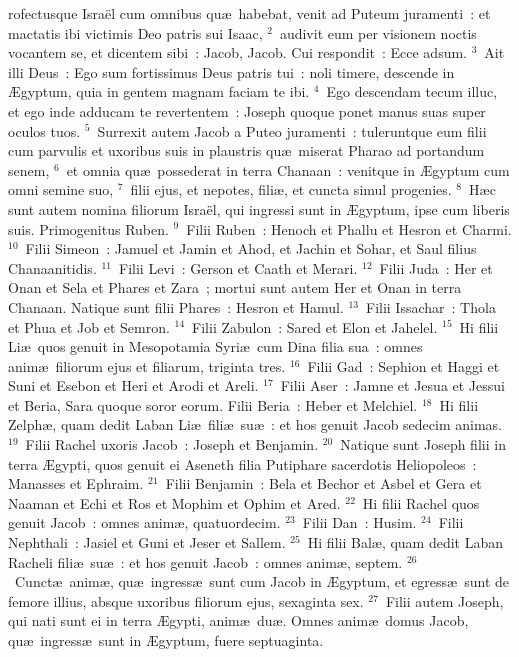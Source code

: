 \bchapter
{}rofectusque Isra\"el cum omnibus qu\ae\ habebat, venit ad Puteum juramenti~: et mactatis ibi victimis Deo patris sui Isaac,
${}^{2}$~audivit eum per visionem noctis vocantem se, et dicentem sibi~: Jacob, Jacob. Cui respondit~: Ecce adsum.
${}^{3}$~Ait illi Deus~: Ego sum fortissimus Deus patris tui~: noli timere, descende in \AE gyptum, quia in gentem magnam faciam te ibi.
${}^{4}$~Ego descendam tecum illuc, et ego inde adducam te revertentem~: Joseph quoque ponet manus suas super oculos tuos.
${}^{5}$~Surrexit autem Jacob a Puteo juramenti~: tuleruntque eum filii cum parvulis et uxoribus suis in plaustris qu\ae\ miserat Pharao ad portandum senem,
${}^{6}$~et omnia qu\ae\ possederat in terra Chanaan~: venitque in \AE gyptum cum omni semine suo,
${}^{7}$~filii ejus, et nepotes, fili\ae , et cuncta simul progenies.
${}^{8}$~H\ae c sunt autem nomina filiorum Isra\"el, qui ingressi sunt in \AE gyptum, ipse cum liberis suis. Primogenitus Ruben.
${}^{9}$~Filii Ruben~: Henoch et Phallu et Hesron et Charmi.
${}^{10}$~Filii Simeon~: Jamuel et Jamin et Ahod, et Jachin et Sohar, et Saul filius Chanaanitidis.
${}^{11}$~Filii Levi~: Gerson et Caath et Merari.
${}^{12}$~Filii Juda~: Her et Onan et Sela et Phares et Zara~; mortui sunt autem Her et Onan in terra Chanaan. Natique sunt filii Phares~: Hesron et Hamul.
${}^{13}$~Filii Issachar~: Thola et Phua et Job et Semron.
${}^{14}$~Filii Zabulon~: Sared et Elon et Jahelel.
${}^{15}$~Hi filii Li\ae\ quos genuit in Mesopotamia Syri\ae\ cum Dina filia sua~: omnes anim\ae\ filiorum ejus et filiarum, triginta tres.
${}^{16}$~Filii Gad~: Sephion et Haggi et Suni et Esebon et Heri et Arodi et Areli.
${}^{17}$~Filii Aser~: Jamne et Jesua et Jessui et Beria, Sara quoque soror eorum. Filii Beria~: Heber et Melchiel.
${}^{18}$~Hi filii Zelph\ae , quam dedit Laban Li\ae\ fili\ae\ su\ae~: et hos genuit Jacob sedecim animas.
${}^{19}$~Filii Rachel uxoris Jacob~: Joseph et Benjamin.
${}^{20}$~Natique sunt Joseph filii in terra \AE gypti, quos genuit ei Aseneth filia Putiphare sacerdotis Heliopoleos~: Manasses et Ephraim.
${}^{21}$~Filii Benjamin~: Bela et Bechor et Asbel et Gera et Naaman et Echi et Ros et Mophim et Ophim et Ared.
${}^{22}$~Hi filii Rachel quos genuit Jacob~: omnes anim\ae , quatuordecim.
${}^{23}$~Filii Dan~: Husim.
${}^{24}$~Filii Nephthali~: Jasiel et Guni et Jeser et Sallem.
${}^{25}$~Hi filii Bal\ae , quam dedit Laban Racheli fili\ae\ su\ae~: et hos genuit Jacob~: omnes anim\ae , septem.
${}^{26}$~Cunct\ae\ anim\ae , qu\ae\ ingress\ae\ sunt cum Jacob in \AE gyptum, et egress\ae\ sunt de femore illius, absque uxoribus filiorum ejus, sexaginta sex.
${}^{27}$~Filii autem Joseph, qui nati sunt ei in terra \AE gypti, anim\ae\ du\ae . Omnes anim\ae\ domus Jacob, qu\ae\ ingress\ae\ sunt in \AE gyptum, fuere septuaginta.


